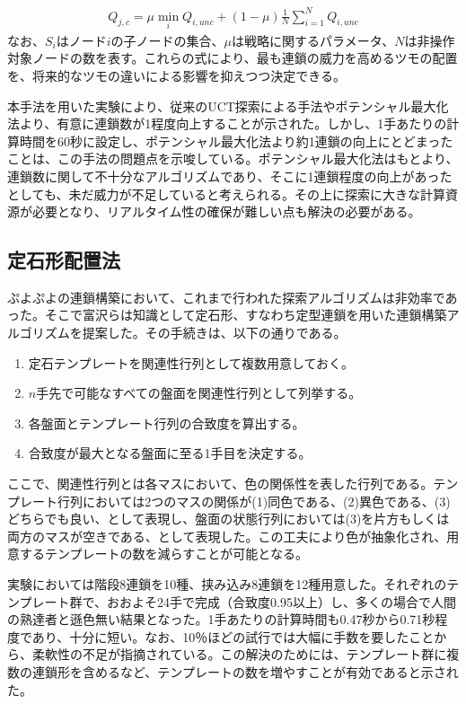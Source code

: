 \documentclass[12pt]{jreport}
\begin{document}
\begin{eqnarray} \label{fo:qj}
  Q_{j,c} = \mu \min_{i} Q_{i,unc}+(1-\mu)\frac{1}{N} \sum_{i=1}^{N} Q_{i,unc}
\end{eqnarray}
なお、$S_i$はノード$i$の子ノードの集合、$\mu$は戦略に関するパラメータ、$N$は非操作対象ノードの数を表す。これらの式により、最も連鎖の威力を高めるツモの配置を、将来的なツモの違いによる影響を抑えつつ決定できる。

本手法を用いた実験により、従来のUCT探索による手法やポテンシャル最大化法より、有意に連鎖数が1程度向上することが示された。しかし、1手あたりの計算時間を60秒に設定し、ポテンシャル最大化法より約1連鎖の向上にとどまったことは、この手法の問題点を示唆している。ポテンシャル最大化法はもとより、連鎖数に関して不十分なアルゴリズムであり、そこに1連鎖程度の向上があったとしても、未だ威力が不足していると考えられる。その上に探索に大きな計算資源が必要となり、リアルタイム性の確保が難しい点も解決の必要がある。


\subsection{定石形配置法}
ぷよぷよの連鎖構築において、これまで行われた探索アルゴリズムは非効率であった。そこで富沢ら\cite{puyo_temp}は知識として定石形、すなわち定型連鎖を用いた連鎖構築アルゴリズムを提案した。その手続きは、以下の通りである。
\begin{enumerate}
\item 定石テンプレートを関連性行列として複数用意しておく。
\item $n$手先で可能なすべての盤面を関連性行列として列挙する。
\item 各盤面とテンプレート行列の合致度を算出する。
\item 合致度が最大となる盤面に至る1手目を決定する。
\end{enumerate}

ここで、関連性行列とは各マスにおいて、色の関係性を表した行列である。テンプレート行列においては2つのマスの関係が(1)同色である、(2)異色である、(3)どちらでも良い、として表現し、盤面の状態行列においては(3)を片方もしくは両方のマスが空きである、として表現した。この工夫により色が抽象化され、用意するテンプレートの数を減らすことが可能となる。

実験においては階段8連鎖を10種、挟み込み8連鎖を12種用意した。それぞれのテンプレート群で、おおよそ24手で完成（合致度0.95以上）し、多くの場合で人間の熟達者と遜色無い結果となった。1手あたりの計算時間も0.47秒から0.71秒程度であり、十分に短い。なお、10％ほどの試行では大幅に手数を要したことから、柔軟性の不足が指摘されている。この解決のためには、テンプレート群に複数の連鎖形を含めるなど、テンプレートの数を増やすことが有効であると示された。
\end{document}
